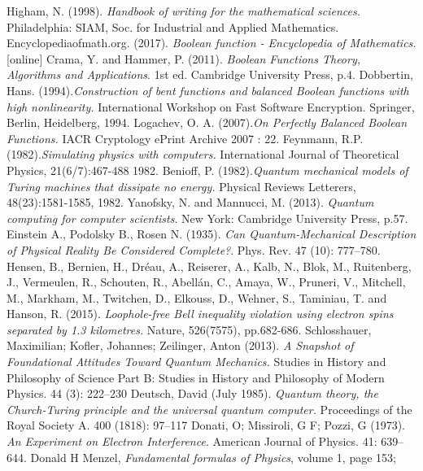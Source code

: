 \documentclass[12pt,a4paper,openright]{report}
\begin{document}
\begin{thebibliography}{20}
     Higham, N. (1998). \emph{Handbook of writing for the mathematical sciences.} Philadelphia: SIAM, Soc. for Industrial and Applied Mathematics.
     Encyclopediaofmath.org. (2017). \emph{Boolean function - Encyclopedia of Mathematics.} [online] 
     Crama, Y. and Hammer, P. (2011). \emph{Boolean Functions Theory, Algorithms and Applications}. 1st ed. Cambridge University Press, p.4.
     Dobbertin, Hans. (1994).\emph{Construction of bent functions and balanced Boolean functions with high nonlinearity.} International Workshop on Fast Software Encryption. Springer, Berlin, Heidelberg, 1994.
     Logachev, O. A. (2007).\emph{On Perfectly Balanced Boolean Functions.} IACR Cryptology ePrint Archive 2007 : 22.
     Feynmann, R.P. (1982).\emph{Simulating physics with computers.} International Journal of Theoretical Physics, 21(6/7):467-488 1982.
     Benioff, P. (1982).\emph{Quantum mechanical models of Turing machines that dissipate no energy.} Physical Reviews Letterers, 48(23):1581-1585, 1982.
     Yanofsky, N. and Mannucci, M. (2013). \emph{Quantum computing for computer scientists}. New York: Cambridge University Press, p.57.
     Einstein A., Podolsky B., Rosen N. (1935). \emph{Can Quantum-Mechanical Description of Physical Reality Be Considered Complete?}. Phys. Rev. 47 (10): 777–780. 
     Hensen, B., Bernien, H., Dréau, A., Reiserer, A., Kalb, N., Blok, M., Ruitenberg, J., Vermeulen, R., Schouten, R., Abellán, C., Amaya, W., Pruneri, V., Mitchell, M., Markham, M., Twitchen, D., Elkouss, D., Wehner, S., Taminiau, T. and Hanson, R. (2015). \emph{Loophole-free Bell inequality violation using electron spins separated by 1.3 kilometres.} Nature, 526(7575), pp.682-686.
     Schlosshauer, Maximilian; Kofler, Johannes; Zeilinger, Anton (2013). \emph{A Snapshot of Foundational Attitudes Toward Quantum Mechanics.} Studies in History and Philosophy of Science Part B: Studies in History and Philosophy of Modern Physics. 44 (3): 222–230
     Deutsch, David (July 1985). \emph{Quantum theory, the Church-Turing principle and the universal quantum computer.} Proceedings of the Royal Society A. 400 (1818): 97–117
     Donati, O; Missiroli, G F; Pozzi, G (1973). \emph{An Experiment on Electron Interference}. American Journal of Physics. 41: 639–644.
     Donald H Menzel, \emph{Fundamental formulas of Physics}, volume 1, page 153; 
\end{thebibliography}
\end{document}
